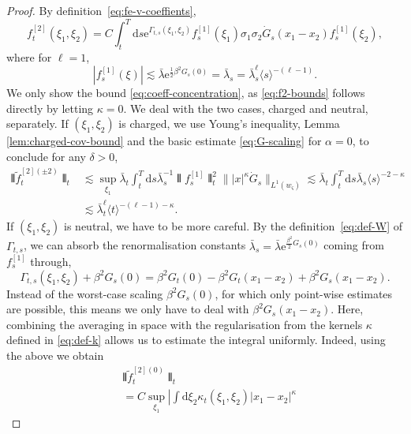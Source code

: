 \documentclass[11pt, a4paper]{scrartcl}
\numberwithin{equation}{section}
\theoremstyle{plain}
\theoremstyle{remark}
\newcommand{\mathd}{\mathrm{d}}
\newcommand{\mathe}{\mathrm{e}}
\begin{document}
\begin{proof}
  By definition~\eqref{eq:fe-v-coeffients},
  \[ f^{[2]}_t (\xi_1, \xi_2) = C \int_t^T \mathd s \mathe^{\Gamma_{t, s} (\xi_1,
     \xi_2)} f^{[1]}_s (\xi_1) \sigma_1 \sigma_2  \dot{G}_s (x_1 - x_2)
     f^{[1]}_s (\xi_2), \]
  where for $\ell = 1$,
  \begin{equation}
    | f^{[1]}_s (\xi) | \lesssim \bar{\lambda} \mathe^{\frac{1}{2} \beta^2 G_s (0)}
    = \bar{\lambda}_s = \bar{\lambda}_s^{\ell} \langle s \rangle^{- (\ell - 1)} .
    \label{eq:v1}
  \end{equation}
  We only show the bound \eqref{eq:coeff-concentration}, as
  \eqref{eq:f2-bounds} follows directly by letting $\kappa = 0$. We deal with
  the two cases, charged and neutral, separately. If $(\xi_1, \xi_2)$ is
  charged, we use Young's inequality, Lemma \ref{lem:charged-cov-bound} and
  the basic estimate \eqref{eq:G-scaling} for $\alpha = 0$, to conclude for
  any $\delta > 0$,
  \begin{align*}
    \interleave \tilde{f}_t^{[2] (\pm 2)} \interleave_t 
    &\lesssim \sup_{\xi_1}
     \bar{\lambda}_t  \int_t^T \mathd s \bar{\lambda}_s^{- 1} \interleave f_s^{[1]}
     \interleave_t^2  \| | x |^{\kappa}  \dot{G}_s \|_{L^1 (w_{\varsigma})}
     \lesssim \bar{\lambda}_t  \int_t^T \mathd s \bar{\lambda}_s \langle s \rangle^{- 2 -
     \kappa} \\
    &\lesssim \bar{\lambda}_t^{\ell} \langle t \rangle^{- (\ell - 1) -
     \kappa} .
  \end{align*}
  If $(\xi_1, \xi_2)$ is neutral, we have to be more careful. By the
  definition~\eqref{eq:def-W} of $\Gamma_{t, s}$, we can absorb the renormalisation
  constants $\bar{\lambda}_s = \bar{\lambda} \mathe^{\frac{\beta^2}{2} G_s (0)}$ coming
  from $f^{[1]}_s$ through,
  \[ \Gamma_{t, s} (\xi_1, \xi_2) + \beta^2 G_s (0) = \beta^2 G_t (0) - \beta^2 G_t
     (x_1 - x_2) + \beta^2 G_s (x_1 - x_2) . \]
  Instead of the worst-case scaling $\beta^2 G_s (0)$, for which only
  point-wise estimates are possible, this means we only have to deal with
  $\beta^2 G_s (x_1 - x_2)$. Here, combining the averaging in space with the
  regularisation from the kernels $\kappa$ defined in \eqref{eq:def-k} allows
  us to estimate the integral uniformly. Indeed, using the above we obtain
  {\footnotesize\begin{align*}
    &\interleave \tilde{f}_t^{[2] (0)} \interleave_t \\
    & =  C \sup_{\xi_1} 
    \left| \int \mathd \xi_2 \kappa_t (\xi_1, \xi_2) | x_1 - x_2 |^{\kappa}

\end{align*}}
\end{proof}
\end{document}
